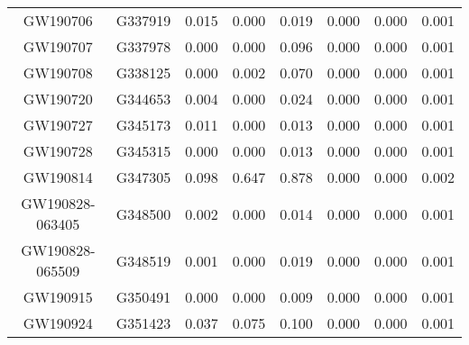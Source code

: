 \begin{table}[]
\begin{tabular}{c|c|ccr|ccr}
GW190706                      & G337919               & 0.015                   & 0.000                    & 0.019                   & 0.000                   & 0.000                    & 0.001                   \\
GW190707                      & G337978               & 0.000                   & 0.000                    & 0.096                   & 0.000                   & 0.000                    & 0.001                   \\
GW190708                      & G338125               & 0.000                   & 0.002                    & 0.070                   & 0.000                   & 0.000                    & 0.001                   \\
GW190720                      & G344653               & 0.004                   & 0.000                    & 0.024                   & 0.000                   & 0.000                    & 0.001                   \\
GW190727                      & G345173               & 0.011                   & 0.000                    & 0.013                   & 0.000                   & 0.000                    & 0.001                   \\
GW190728                      & G345315               & 0.000                   & 0.000                    & 0.013                   & 0.000                   & 0.000                    & 0.001                   \\
GW190814                      & G347305               & 0.098                   & 0.647                    & 0.878                   & 0.000                   & 0.000                    & 0.002                   \\
GW190828-063405               & G348500               & 0.002                   & 0.000                    & 0.014                   & 0.000                   & 0.000                    & 0.001                   \\
GW190828-065509               & G348519               & 0.001                   & 0.000                    & 0.019                   & 0.000                   & 0.000                    & 0.001                   \\
GW190915                      & G350491               & 0.000                   & 0.000                    & 0.009                   & 0.000                   & 0.000                    & 0.001                   \\
GW190924                      & G351423               & 0.037                   & 0.075                    & 0.100                   & 0.000                   & 0.000                    & 0.001                   \\

\end{tabular}
\end{table}
